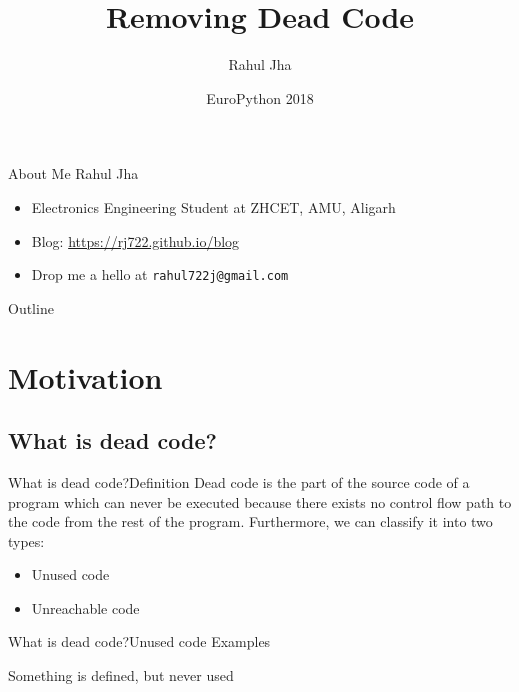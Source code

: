 \documentclass{beamer}
\title{Removing Dead Code}
\author{Rahul Jha}
\date{EuroPython 2018}
\begin{document}
\begin{frame}
  \titlepage
\end{frame}


\begin{frame}{About Me}
    Rahul Jha
    \begin{itemize}
        \item
        Electronics Engineering Student at ZHCET, AMU, Aligarh
        \item
        Blog: \url{https://rj722.github.io/blog}
        \item
        Drop me a hello at \texttt{rahul722j@gmail.com}
    \end{itemize}
\end{frame}

\begin{frame}{Outline}
  \tableofcontents
\end{frame}

\section{Motivation}

\subsection{What is dead code?}

\begin{frame}{What is dead code?}{Definition}
    Dead code is the part of the source code of a program which can never be executed because there exists no control flow path to the code from the rest of the program.
    \newline
    \newline
    Furthermore, we can classify it into two types:
    \begin{itemize}
        \item {
            Unused code
        }
        \item {
            Unreachable code
        }
    \end{itemize}

\end{frame}

\begin{frame}{What is dead code?}{Unused code Examples}
    \begin{example}{Something is defined, but never used}
        \inputminted{python}{content/unused_code.py}
    \end{example}   
\end{frame}
\end{document}
